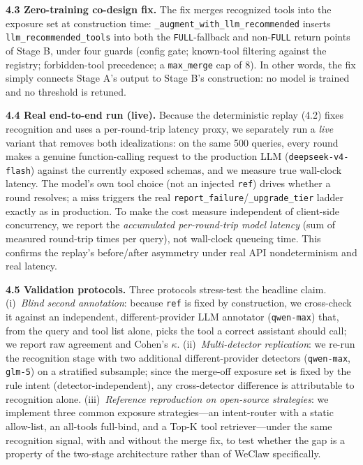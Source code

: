 \textbf{4.3 Zero-training co-design fix.} The fix merges recognized tools into the exposure set at construction time: \texttt{\_augment\_with\_llm\_recommended} inserts \texttt{llm\_recommended\_tools} into both the \texttt{FULL}-fallback and non-\texttt{FULL} return points of Stage B, under four guards (config gate; known-tool filtering against the registry; forbidden-tool precedence; a \texttt{max\_merge} cap of 8). In other words, the fix simply connects Stage A's output to Stage B's construction: no model is trained and no threshold is retuned.

\textbf{4.4 Real end-to-end run (live).} Because the deterministic replay (4.2) fixes recognition and uses a per-round-trip latency proxy, we separately run a \emph{live} variant that removes both idealizations: on the same 500 queries, every round makes a genuine function-calling request to the production LLM (\texttt{deepseek-v4-flash}) against the currently exposed schemas, and we measure true wall-clock latency. The model's own tool choice (not an injected \texttt{ref}) drives whether a round resolves; a miss triggers the real \texttt{report\_failure}/\texttt{\_upgrade\_tier} ladder exactly as in production. To make the cost measure independent of client-side concurrency, we report the \emph{accumulated per-round-trip model latency} (sum of measured round-trip times per query), not wall-clock queueing time. This confirms the replay's before/after asymmetry under real API nondeterminism and real latency.

\textbf{4.5 Validation protocols.} Three protocols stress-test the headline claim. (i)~\emph{Blind second annotation}: because \texttt{ref} is fixed by construction, we cross-check it against an independent, different-provider LLM annotator (\texttt{qwen-max}) that, from the query and tool list alone, picks the tool a correct assistant should call; we report raw agreement and Cohen's $\kappa$. (ii)~\emph{Multi-detector replication}: we re-run the recognition stage with two additional different-provider detectors (\texttt{qwen-max}, \texttt{glm-5}) on a stratified subsample; since the merge-off exposure set is fixed by the rule intent (detector-independent), any cross-detector difference is attributable to recognition alone. (iii)~\emph{Reference reproduction on open-source strategies}: we implement three common exposure strategies---an intent-router with a static allow-list, an all-tools full-bind, and a Top-K tool retriever---under the same recognition signal, with and without the merge fix, to test whether the gap is a property of the two-stage architecture rather than of WeClaw specifically.

